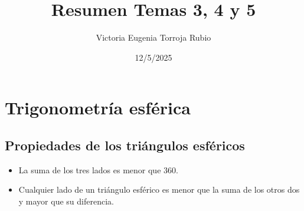 \documentclass{article}
\begin{document}
\title{Resumen Temas 3, 4 y 5}
\author{Victoria Eugenia Torroja Rubio}
\date{12/5/2025}

\maketitle

\section{Trigonometría esférica}
\subsection{Propiedades de los triángulos esféricos}
\begin{itemize}
\item La suma de los tres lados es menor que 360.
\item Cualquier lado de un triángulo esférico es menor que la suma de los otros dos y mayor que su diferencia.
\end{itemize}
\end{document}
